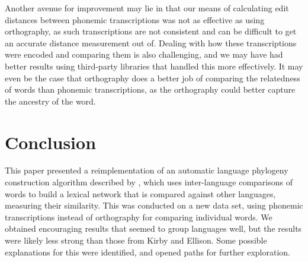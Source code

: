 \documentclass[10pt,a4]{article}
\begin{document}
Another avenue for improvement may lie in that our means of calculating edit distances between phonemic transcriptions was not as effective as using orthography, as such transcriptions are not consistent and can be difficult to get an accurate distance measurement out of.  Dealing with how these transcriptions were encoded and comparing them is also challenging, and we may have had better results using third-party libraries that handled this more effectively.  It may even be the case that orthography does a better job of comparing the relatedness of words than phonemic transcriptions, as the orthography could better capture the ancestry of the word.

\section{Conclusion}

This paper presented a reimplementation of an automatic language phylogeny construction algorithm described by , which uses inter-language comparisons of words to build a lexical network that is compared against other languages, measuring their similarity.  This was conducted on a new data set, using phonemic transcriptions instead of orthography for comparing individual words.  We obtained encouraging results that seemed to group languages well, but the results were likely less strong than those from Kirby and Ellison.  Some possible explanations for this were identified, and opened paths for further exploration.




\setlength{\bibleftmargin}{.125in}
\setlength{\bibindent}{-\bibleftmargin}


\end{document}
